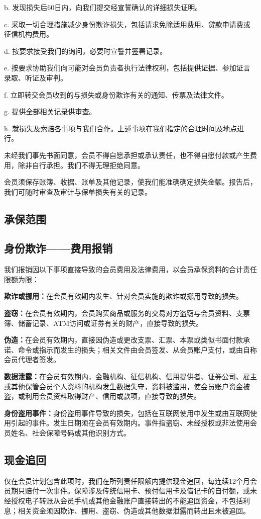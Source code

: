 \documentclass[UTF8,fontset=none,11pt,a4paper]{ctexart}
\begin{document}
b. 发现损失后60日内，向我们提交经宣誓确认的详细损失证明。


c. 采取一切合理措施减少身份欺诈损失，包括请求免除适用费用、贷款申请费或征信机构费用。


d. 按要求接受我们的询问，必要时宣誓并签署记录。


e. 按要求协助我们向可能对会员负责者执行法律权利，包括提供证据、参加证言录取、听证及审判。


f. 立即转交会员收到的与损失或身份欺诈有关的通知、传票及法律文件。


g. 提供全部相关记录供审查。


h. 就损失及索赔各事项与我们合作。上述事项在我们指定的合理时间及地点进行。


未经我们事先书面同意，会员不得自愿承担或承认责任，也不得自愿付款或产生费用，除非自行承担。我们不得无理拒绝同意。


会员须保存账簿、收据、账单及其他记录，使我们能准确确定损失金额。报告后，我们可随时审查及审计与保单损失有关的记录。


\subsection*{承保范围}
\subsection*{身份欺诈——费用报销}
我们报销因以下事项直接导致的会员费用及法律费用，以会员承保资料的合计责任限额为限：


\textbf{欺诈或挪用：}在会员有效期内发生、针对会员实施的欺诈或挪用导致的损失。


\textbf{盗窃：}在会员有效期内，会员购买商品或服务的交易对方盗窃与会员资料、支票簿、储蓄记录、ATM访问或证券有关的财产，直接导致的损失。


\textbf{伪造：}在会员有效期内，直接因伪造或更改支票、汇票、本票或类似书面付款承诺、命令或指示而发生的损失；相关文件由会员签发、从会员账户支付，或由自称会员代理者签发。


\textbf{数据泄露：}在会员有效期内，金融机构、征信机构、信用提供者、证券公司、雇主或其他保管会员个人资料的机构发生数据失守，资料被滥用，使会员账户资金被盗，或利用会员资料取得财产、信用或款项，直接导致的损失。


\textbf{身份盗用事件：}身份盗用事件导致的损失，包括在互联网使用中发生或由互联网使用引起的事件。发生日期须在会员有效期内。事件指盗窃、未经授权或非法使用会员姓名、社会保障号码或其他识别方式。


\subsection*{现金追回}
仅在会员计划包含此项时，我们在所列责任限额内提供现金追回，每连续12个月会员期只赔付一次事件。保障涉及传统信用卡、预付信用卡及借记卡的自付额，或未经授权电子转账从会员手机或其他金融账户直接转出的不能追回资金，不包括利息；相关资金须因欺诈、挪用、盗窃、伪造或其他数据泄露而转出且未被追回。
\end{document}
